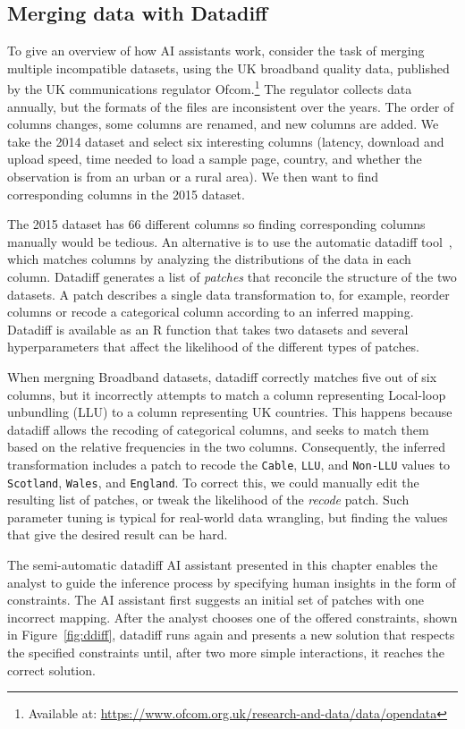 \documentclass[fleqn,11pt]{report}
\theoremstyle{definition}
\begin{document}
\subsection{Merging data with Datadiff}

To give an overview of how AI assistants work, consider the task of merging
multiple incompatible datasets, using the UK broadband quality data, published
by the UK communications regulator Ofcom.\footnote{Available at: \url{https://www.ofcom.org.uk/research-and-data/data/opendata}}
The regulator collects data annually, but the formats of the files are inconsistent over the
years. The order of columns changes, some columns are renamed, and new columns are added. We
take the 2014 dataset and select six interesting columns (latency, download and
upload speed, time needed to load a sample page, country, and whether the observation is from
an urban or a rural area). We then want to find corresponding columns in the 2015 dataset.

The 2015 dataset has 66 different columns so finding corresponding columns manually would be
tedious. An alternative is to use the automatic datadiff tool~\citep{sutton-2018-datadiff}, which
matches columns by analyzing the distributions of the data in each column. Datadiff generates a list of
\emph{patches} that reconcile the structure of the two datasets. A patch describes a single data
transformation to, for example, reorder columns or recode a categorical column according to an
inferred mapping. Datadiff is available as an R function that takes two datasets and several
hyperparameters that affect the likelihood of the different types of patches.

When mergning Broadband datasets, datadiff correctly matches five out of six columns, but it
incorrectly attempts to match a column representing Local-loop unbundling (LLU) to a column
representing UK countries. This happens because datadiff allows the recoding of categorical columns,
and seeks to match them based on the relative frequencies in the two columns. Consequently,
the inferred transformation includes a patch to recode the \texttt{Cable}, \texttt{LLU}, and
\texttt{Non-LLU} values to \texttt{Scotland}, \texttt{Wales}, and \texttt{England}. To correct this,
we could manually edit the resulting list of patches, or tweak the likelihood of the
\emph{recode} patch. Such parameter tuning is typical for real-world data wrangling, but finding
the values that give the desired result can be hard.

The semi-automatic datadiff AI assistant presented in this chapter enables the analyst to guide
the inference process by specifying human insights in the form of constraints.
The AI assistant first suggests an initial set of patches with one incorrect mapping. After the
analyst chooses one of the offered constraints, shown in Figure~\ref{fig:ddiff}, datadiff
runs again and presents a new solution that respects the specified constraints
until, after two more simple interactions, it reaches the correct solution.
\end{document}
